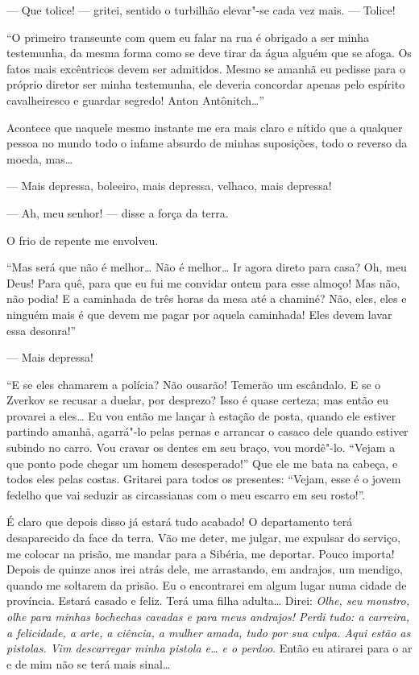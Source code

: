 --- Que tolice! --- gritei, sentido o turbilhão elevar"-se cada vez mais. ---
Tolice!

``O primeiro transeunte com quem eu falar na rua é obrigado a ser minha
testemunha, da mesma forma como se deve tirar da água alguém que se
afoga. Os fatos mais excêntricos devem ser admitidos. Mesmo se amanhã
eu pedisse para o próprio diretor ser minha testemunha, ele deveria
concordar apenas pelo espírito cavalheiresco e guardar segredo! Anton
Antônitch\ldots{}''

Acontece que naquele mesmo instante me era mais claro e nítido que a
qualquer pessoa no mundo todo o infame absurdo de minhas suposições,
todo o reverso da moeda, mas\ldots{}

--- Mais depressa, boleeiro, mais depressa, velhaco, mais depressa!

--- Ah, meu senhor! --- disse a força da terra.

O frio de repente me envolveu.

``Mas será que não é melhor\ldots{} Não é melhor\ldots{} Ir agora direto para casa?
Oh, meu Deus! Para quê, para que eu fui me convidar ontem para esse
almoço! Mas não, não podia! E a caminhada de três horas da mesa até a
chaminé? Não, eles, eles e ninguém mais é que devem me pagar por aquela
caminhada! Eles devem lavar essa desonra!''

--- Mais depressa!

``E se eles chamarem a polícia? Não ousarão! Temerão um escândalo. E se o
Zverkov se recusar a duelar, por desprezo? Isso é quase certeza; mas então eu
provarei a eles\ldots{} Eu vou então me lançar à estação de posta, quando ele
estiver partindo amanhã, agarrá"-lo pelas pernas e arrancar o casaco dele quando
estiver subindo no carro. Vou cravar os dentes em seu braço, vou mordê"-lo.
``Vejam a que ponto pode chegar um homem desesperado!'' Que ele me bata na
cabeça, e todos eles pelas costas.  Gritarei para todos os presentes: ``Vejam,
esse é o jovem fedelho que vai seduzir as circassianas com o meu escarro em seu
rosto!''.

É claro que depois disso já estará tudo acabado! O departamento terá
desaparecido da face da terra. Vão me deter, me julgar, me expulsar do serviço,
me colocar na prisão, me mandar para a Sibéria, me deportar.  Pouco importa!
Depois de quinze anos irei atrás dele, me arrastando, em andrajos, um mendigo,
quando me soltarem da prisão. Eu o encontrarei em algum lugar numa cidade de
província. Estará casado e feliz. Terá uma filha adulta\ldots{} Direi: \textit{Olhe,
seu monstro, olhe para minhas bochechas cavadas e para meus andrajos! Perdi
tudo: a carreira, a felicidade, a arte, a ciência, \emph{a mulher amada},
tudo por sua culpa. Aqui estão as pistolas. Vim descarregar minha pistola
e\ldots{} e o perdoo}. Então eu atirarei para o ar e de mim não se terá mais
sinal\ldots{}

